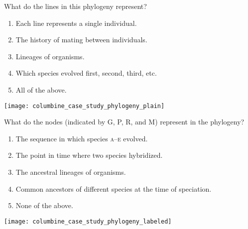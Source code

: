 \documentclass[t,hidelinks]{beamer}
\newcommand{\ques}[1]{\highlight{\textsc{q#1:}}}
\begin{document}
%
\begin{frame}[t]{\ques2 What do the lines in this phylogeny represent?}

	\begin{multicols}{2}
	\begin{enumerate}

		\item Each line represents a single individual.

		\item The history of mating between individuals.

		\item \alert<2>{Lineages of organisms.}

		\item Which species evolved first, second, third, etc.

		\item All of the above. 

	\end{enumerate}

	\columnbreak
	
	\hfill \texttt{[image: columbine\_case\_study\_phylogeny\_plain]}
	\end{multicols}
\end{frame}
%
\begin{frame}[t]{\ques3 What do the nodes (indicated by G, P, R, and M) represent in the phylogeny?}

	\begin{multicols}{2}
	\begin{enumerate}

		\item The sequence in which species \textsc{a}–\textsc{e} evolved.
		
		\item The point in time where two species hybridized.
		
		\item The ancestral lineages of organisms.
		
		\item \alert<2>{Common ancestors of different species at the time of speciation.}
		
		\item None of the above.

	\end{enumerate}

	\columnbreak
	
	\hfill \texttt{[image: columbine\_case\_study\_phylogeny\_labeled]}
		
	\end{multicols}
\end{frame}
\end{document}
